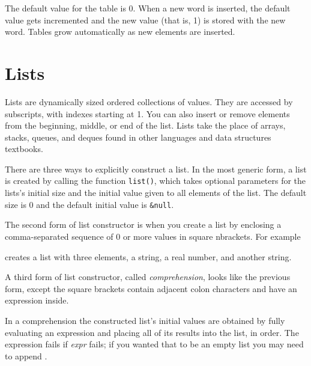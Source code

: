
The default value for the table is 0. When a new word is inserted, the
default value gets incremented and the new value (that is, 1) is stored
with the new word. Tables grow automatically as new elements are
inserted.

\section{Lists}

Lists are dynamically sized ordered
collections of values. They are accessed by subscripts, with indexes
starting at 1. You can also insert or remove
elements from the beginning, middle, or end of the list. Lists take the
place of arrays, stacks, queues,
and deques found in other languages and data structures
textbooks.

There are three ways to explicitly construct a list.  In the most
generic form,
a list is created by calling the function \texttt{list()}, which
takes optional parameters for the lists's initial size and the initial value
given to all elements of the list.  The default size is 0 and the
default initial value is \texttt{\&null}.

The second form of list constructor is when you create a list by
enclosing a comma-separated sequence of 0 or more values in square
nbrackets. For example


\noindent creates a list with three elements, a string, a real number,
and another string.

A third form of list constructor, called {\em comprehension\/}, looks
like the previous form, except the square brackets contain adjacent colon
characters and have an expression inside.


In a comprehension the constructed list's initial values are obtained
by fully evaluating an expression and placing all of its results into the
list, in order. The expression fails if {\em expr\/} fails; if you
wanted that to be an empty list you may need to append
\texttt{\textbar []}.

